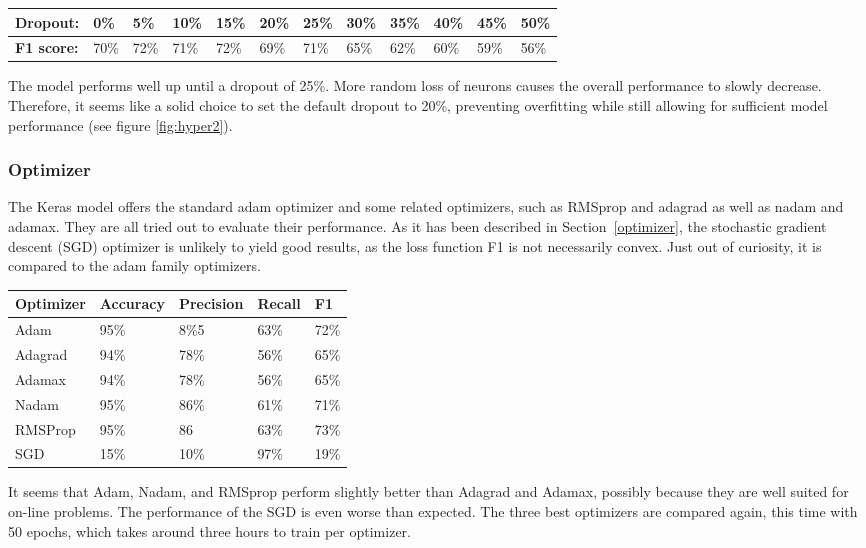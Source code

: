 \documentclass[
a4paper,
pagesize,
pdftex,
12pt,
twoside, %
BCOR=5mm, %
ngerman,
fleqn,
final,
]{scrartcl}
\begin{document}
	\begin{tabular} { | p{2cm} || p{0.7cm} | p{0.7cm} | p{0.7cm} | p{0.7cm}  | p{0.7cm} | p{0.7cm} | p{0.7cm} | p{0.7cm} | p{0.7cm} | p{0.7cm} | p{0.7cm} |}
		\hline
		\textbf{Dropout:}  & 0\% & 5\% & 10\% & 15\%   & 20\% & 25\% & 30\% & 35\% & 40\% & 45\% & 50\% \\   
		\hline
		\textbf{F1 score:} & 70\% & 72\% & 71\% & 72\% & 69\% & 71\% & 65\% & 62\% & 60\% & 59\% & 56\% \\
		\hline
		\hline
	\end{tabular}
	
	The model performs well up until a dropout of 25\%. More random loss of neurons causes the overall performance to slowly decrease. Therefore, it seems like a solid choice to set the default dropout to 20\%, preventing overfitting while still allowing for sufficient model performance (see figure \ref{fig:hyper2}).

	\subsubsection{Optimizer}
	
	The Keras model offers the standard adam optimizer and some related optimizers, such as RMSprop and adagrad as well as nadam and adamax. They are all tried out to evaluate their performance. As it has been described in Section~\ref{optimizer}, the stochastic gradient descent (SGD) optimizer is unlikely to yield good results, as the loss function F1 is not necessarily convex. Just out of curiosity, it is compared to the adam family optimizers. 
	
	\begin{tabular}{ | p{3cm} || p{2cm}|p{2cm}|p{2cm}|p{2cm}|  }
		\hline
		\textbf{Optimizer} & \textbf{Accuracy} & \textbf{Precision} & \textbf{Recall} & \textbf{F1} \\
		\hline
		Adam & 95\% &  8\%5 &  63\% &  72\% \\  
		Adagrad & 94\% &  78\% &  56\% &  65\% \\ 
		Adamax & 94\% &  78\% &  56\% &  65\% \\ 
		Nadam & 95\% &  86\% &  61\% &  71\% \\ 
		RMSProp & 95\% &  86 &  63\% &  73\% \\ 
		SGD & 15\% &  10\% &  97\% & 19\% \\
		\hline
		\hline
	\end{tabular}
	
	It seems that Adam, Nadam, and RMSprop perform slightly better than Adagrad and Adamax, possibly because they are well suited for on-line problems. The performance of the SGD is even worse than expected. The three best optimizers are compared again, this time with 50 epochs, which takes around three hours to train per optimizer.
	
\end{document}
